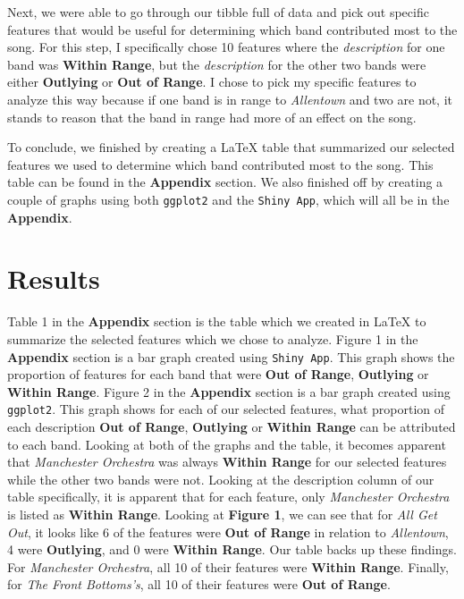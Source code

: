 \documentclass{article}\usepackage[]{graphicx}\usepackage[]{xcolor}
\begin{document}
\begin{multicols}{2}
\par\indent
Next, we were able to go through our tibble full of data and pick out specific features that would be useful for determining which band contributed most to the song. For this step, I specifically chose 10 features where the \textit{description} for one band was \textbf{Within Range}, but the \textit{description} for the other two bands were either \textbf{Outlying} or \textbf{Out of Range}. I chose to pick my specific features to analyze this way because if one band is in range to \textit{Allentown} and two are not, it stands to reason that the band in range had more of an effect on the song.
\par\indent
To conclude, we finished by creating a \LaTeX{} table that summarized our selected features we used to determine which band contributed most to the song. This table can be found in the \textbf{Appendix} section. We also finished off by creating a couple of graphs using both \texttt{ggplot2} and the \texttt{Shiny App}, which will all be in the \textbf{Appendix}.

\section{Results}
Table 1 in the \textbf{Appendix} section is the table which we created in \LaTeX{} to summarize the selected features which we chose to analyze. Figure 1 in the \textbf{Appendix} section is a bar graph created using \texttt{Shiny App}. This graph shows the proportion of features for each band that were \textbf{Out of Range}, \textbf{Outlying} or \textbf{Within Range}. Figure 2 in the \textbf{Appendix} section is a bar graph created using \texttt{ggplot2}. This graph shows for each of our selected features, what proportion of each description  \textbf{Out of Range}, \textbf{Outlying} or \textbf{Within Range} can be attributed to each band. Looking at both of the graphs and the table, it becomes apparent that \textit{Manchester Orchestra} was always \textbf{Within Range} for our selected features while the other two bands were not. Looking at the description column of our table specifically, it is apparent that for each feature, only \textit{Manchester Orchestra} is listed as \textbf{Within Range}. Looking at \textbf{Figure 1}, we can see that for \textit{All Get Out}, it looks like 6 of the features were \textbf{Out of Range} in relation to \textit{Allentown}, 4 were \textbf{Outlying}, and 0 were \textbf{Within Range}. Our table backs up these findings. For \textit{Manchester Orchestra}, all 10 of their features were \textbf{Within Range}. Finally, for \textit{The Front Bottoms's}, all 10 of their features were \textbf{Out of Range}.



\end{multicols}
\end{document}
